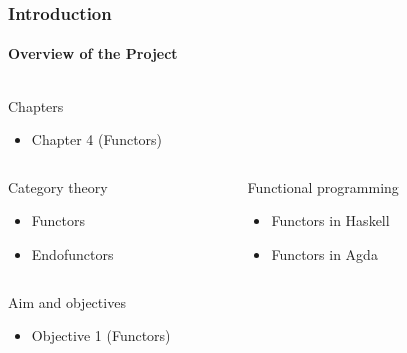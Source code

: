\documentclass{beamer}
\begin{document}

\begin{frame}[label={chap:functors}]
  \frametitle{Introduction}
  \framesubtitle{Overview of the Project}

  \begin{columns}[onlytextwidth,t]
    \begin{column}{\textwidth}
      \begin{block}{Chapters}
        \begin{itemize}
        \item Chapter 4 (Functors)
        \end{itemize}
      \end{block}
    \end{column}
  \end{columns}
  \begin{columns}[onlytextwidth,t]
    \begin{column}{.5\textwidth}
      \begin{block}{Category theory}
        \begin{itemize}
        \item Functors
        \item Endofunctors
        \end{itemize}
      \end{block}
    \end{column}
    \begin{column}{.5\textwidth}
      \begin{block}{Functional programming}
        \begin{itemize}
        \item Functors in Haskell
        \item Functors in Agda
        \end{itemize}
      \end{block}
    \end{column}
  \end{columns}
  \begin{columns}[onlytextwidth,t]
    \begin{column}{\textwidth}
      \begin{block}{Aim and objectives}
        \begin{itemize}
        \item Objective 1 (Functors)
        \end{itemize}
      \end{block}
    \end{column}
  \end{columns}

\end{frame}
\end{document}
